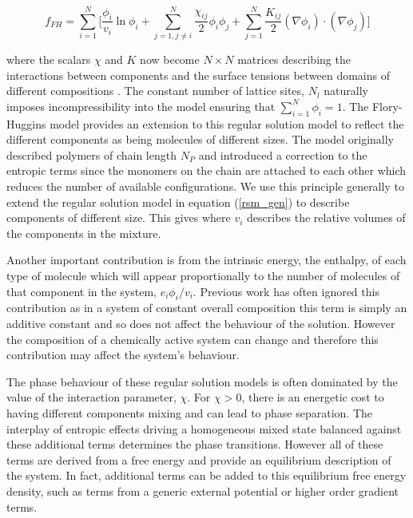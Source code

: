 \begin{equation}
    f_{FH} = \sum_{i=1}^{N}\Bigg[\frac{\phi_i}{v_i}\ln\phi_i+\sum_{j=1, j\neq i}^{N}\frac{\chi_{ij}}{2}\phi_i\phi_j + \sum_{j=1}^{N} \frac{K_{ij}}{2}(\nabla\phi_i)\cdot(\nabla\phi_j)\Bigg]
    \label{fh_gen}
\end{equation}

where the scalars $\chi$ and $K$ now become $N \times N$ matrices describing the interactions between components and the surface tensions between domains of different compositions \cite{berry_physical_2018}. The constant number of lattice sites, $N_l$ naturally imposes incompressibility into the model ensuring that $\sum_{i=1}^N\phi_i=1$.
The Flory-Huggins model provides an extension to this regular solution model to reflect the different components as being molecules of different sizes. The model originally described polymers of chain length $N_P$ and introduced a correction to the entropic terms since the monomers on the chain are attached to each other which reduces the number of available configurations. We use this principle generally to extend the regular solution model in equation (\ref{rsm_gen}) to describe components of different size. This gives where $v_i$ describes the relative volumes of the components in the mixture. 

Another important contribution is from the intrinsic energy, the enthalpy, of each type of molecule which will appear proportionally to the number of molecules of that component in the system, $e_i \phi_i / v_i$. Previous work has often ignored this contribution as in a system of constant overall composition this term is simply an additive constant and so does not affect the behaviour of the solution. However the composition of a chemically active system can change and therefore this contribution may affect the system's behaviour.

The phase behaviour of these regular solution models is often dominated by the value of the interaction parameter, $\chi$. For $\chi > 0 $, there is an energetic cost to having different components mixing and can lead to phase separation. The interplay of entropic effects driving a homogeneous mixed state balanced against these additional terms determines the phase transitions. However all of these terms are derived from a free energy and provide an equilibrium description of the system. In fact, additional terms can be added to this equilibrium free energy density, such as terms from a generic external potential or higher order gradient terms. 

